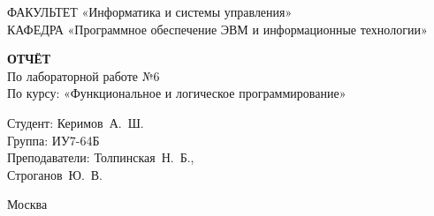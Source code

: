 \begin{titlepage}
{	{\doublespacing \small \raggedright ФАКУЛЬТЕТ \hspace{25mm} «Информатика и системы управления»\\
	КАФЕДРА \hspace{5mm} «Программное обеспечение ЭВМ и информационные технологии»\\}

	\vspace{30mm}

	\textbf{ОТЧЁТ}\\
	По лабораторной работе №6\\
	По курсу: «Функциональное и логическое программирование»\\

	\vspace{60mm}

	\hspace{70mm} Студент:       \hfill Керимов~А.~Ш.\\
	\hspace{70mm} Группа:        \hfill ИУ7-64Б\\
	\hspace{70mm} Преподаватели: \hfill Толпинская~Н.~Б.,\\
	                             \hfill Строганов~Ю.~В.\\

	\vfill

	Москва\\
	\the\year\\}
\end{titlepage}

\setcounter{page}{2}
